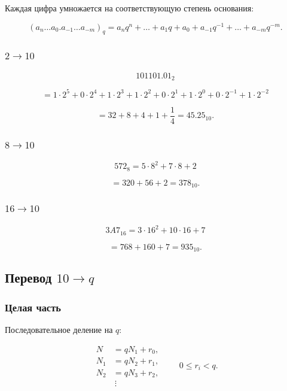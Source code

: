 \documentclass[../final.tex]{subfiles}
\begin{document}
Каждая цифра умножается на соответствующую степень основания:

\[
(a_n\ldots a_0.a_{-1}\ldots a_{-m})_q
=
a_nq^n+\ldots+a_1q+a_0
+a_{-1}q^{-1}
+\ldots
+a_{-m}q^{-m}.
\]

\subsubsection{\texorpdfstring{$2 \to 10$}{2 → 10}}

\[
101101.01_2
\]

\[
=
1\cdot2^5
+0\cdot2^4
+1\cdot2^3
+1\cdot2^2
+0\cdot2^1
+1\cdot2^0
+0\cdot2^{-1}
+1\cdot2^{-2}
\]

\[
=
32+8+4+1+\frac14
=
45.25_{10}.
\]

\subsubsection{\texorpdfstring{$8 \to 10$}{8 → 10}}

\[
572_8
=
5\cdot8^2+7\cdot8+2
\]

\[
=
320+56+2
=
378_{10}.
\]

\subsubsection{\texorpdfstring{$16 \to 10$}{16 → 10}}

\[
3A7_{16}
=
3\cdot16^2+10\cdot16+7
\]

\[
=
768+160+7
=
935_{10}.
\]



\subsection{Перевод \texorpdfstring{$10 \to q$}{10 → q}}

\subsubsection{Целая часть}

Последовательное деление на $q$:

\[
\begin{aligned}
N   &=qN_1+r_0,\\
N_1 &=qN_2+r_1,\\
N_2 &=qN_3+r_2,\\
    &\ \vdots
\end{aligned}
\qquad
0\leq r_i<q.
\]
\end{document}
